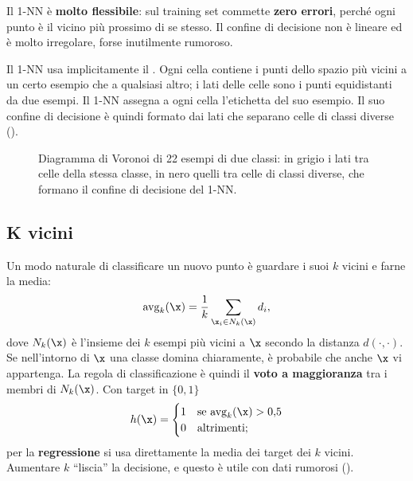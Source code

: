 Il 1-NN è \textbf{molto flessibile}: sul training set commette \textbf{zero errori}, perché ogni punto è il
vicino più prossimo di se stesso. Il confine di decisione non è lineare ed è molto irregolare, forse inutilmente
rumoroso.

Il 1-NN usa implicitamente il . Ogni cella contiene i punti dello spazio più vicini
a un certo esempio che a qualsiasi altro; i lati delle celle sono i punti equidistanti da due esempi. Il 1-NN
assegna a ogni cella l'etichetta del suo esempio. Il suo confine di decisione è quindi formato dai lati che
separano celle di classi diverse ().

\begin{figure}[ht]
\centering
{}
\caption{Diagramma di Voronoi di 22 esempi di due classi: in grigio i lati tra celle della stessa classe, in nero
quelli tra celle di classi diverse, che formano il confine di decisione del 1-NN.}
\label{fig:voronoi}
\end{figure}

\subsection{K vicini}

Un modo naturale di classificare un nuovo punto è guardare i suoi $k$ vicini e farne la media:
\[
\mathrm{avg}_k(\x) = \frac1k\sum_{\x_i\in N_k(\x)}d_i ,
\]
dove $N_k(\x)$ è l'insieme dei $k$ esempi più vicini a $\x$ secondo la distanza $d(\cdot,\cdot)$. Se nell'intorno
di $\x$ una classe domina chiaramente, è probabile che anche $\x$ vi appartenga. La regola di classificazione è
quindi il \textbf{voto a maggioranza} tra i membri di $N_k(\x)$. Con target in $\{0,1\}$
\[
h(\x) = \begin{cases}1 & \text{se } \mathrm{avg}_k(\x) > 0{,}5\\ 0 & \text{altrimenti;}\end{cases}
\]
per la \textbf{regressione} si usa direttamente la media dei target dei $k$ vicini. Aumentare $k$ ``liscia'' la
decisione, e questo è utile con dati rumorosi ().


